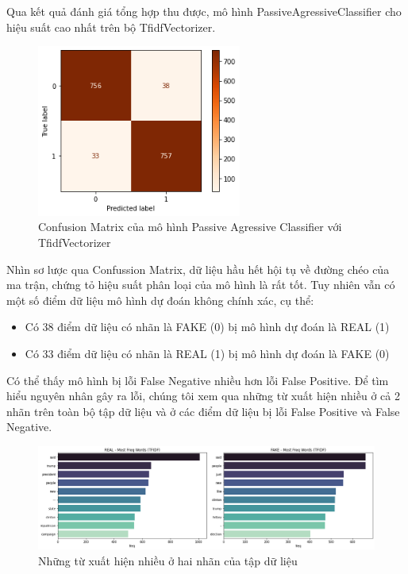 \documentclass[12pt,a4paper,oneside]{book}
\begin{document}
Qua kết quả đánh giá tổng hợp thu được, mô hình PassiveAgressiveClassifier cho hiệu suất cao nhất trên bộ TfidfVectorizer.
\begin{figure}[H]
	\centering
	\captionsetup{width=0.6\textwidth}
	\includegraphics[width=0.6\textwidth]{tfpa_2}
	\caption{Confusion Matrix của mô hình Passive Agressive Classifier với TfidfVectorizer}
\end{figure}
Nhìn sơ lược qua Confussion Matrix, dữ liệu hầu hết hội tụ về đường chéo của ma trận, chứng tỏ hiệu suất phân loại của mô hình là rất tốt. Tuy nhiên vẫn có một số điểm dữ liệu mô hình dự đoán không chính xác, cụ thể:
\begin{itemize}
\item Có 38 điểm dữ liệu có nhãn là FAKE (0) bị mô hình dự đoán là REAL (1)
\item Có 33 điểm dữ liệu có nhãn là REAL (1) bị mô hình dự đoán là FAKE (0)
\end{itemize}

Có thể thấy mô hình bị lỗi False Negative nhiều hơn lỗi False Positive.
Để tìm hiểu nguyên nhân gây ra lỗi, chúng tôi xem qua những từ xuất hiện nhiều ở cả 2 nhãn trên toàn bộ tập dữ liệu và ở các điểm dữ liệu bị lỗi False Positive và False Negative.
\begin{figure}[H]
	\centering
	\includegraphics[width=1\textwidth]{frequentdata}
	\caption{Những từ xuất hiện nhiều ở hai nhãn của tập dữ liệu}
\end{figure}
\end{document}
